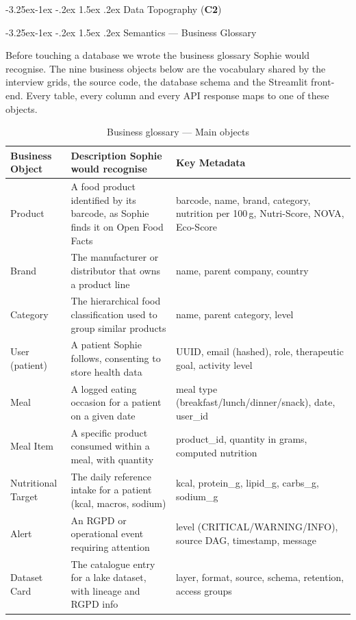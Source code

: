 \documentclass[a4paper,11pt,oneside,openany]{report}
\makeatletter
\renewcommand\subsection{\@startsection{subsection}{2}{\z@}%
  {-3.25ex\@plus -1ex \@minus -.2ex}%
  {1.5ex \@plus .2ex}%
  {\normalfont\large\bfseries\color{ntdarkgreen}}}
\renewcommand\subsubsection{\@startsection{subsubsection}{3}{\z@}%
  {-3.25ex\@plus -1ex \@minus -.2ex}%
  {1.5ex \@plus .2ex}%
  {\normalfont\normalsize\bfseries\color{ntblue}}}
\newcommand{\competence}[1]{\textbf{\textcolor{ntgreen}{#1}}}
\newcommand{\off}{Open Food Facts}
\newcommand{\rgpd}{RGPD}
\makeatother
\begin{document}
\subsection{Data Topography (\competence{C2})}

\subsubsection{Semantics --- Business Glossary}

Before touching a database we wrote the business glossary Sophie
would recognise. The nine business objects below are the
vocabulary shared by the interview grids, the source code, the
database schema and the Streamlit front-end. Every table, every
column and every API response maps to one of these objects.

\begin{table}[H]
\centering
\caption{Business glossary --- Main objects}
\label{tab:glossary}
\begin{tabularx}{\textwidth}{L{2.5cm} L{5cm} L{5.5cm}}
\toprule
\textbf{Business Object} & \textbf{Description Sophie would recognise} & \textbf{Key Metadata} \\
\midrule
Product & A food product identified by its barcode, as Sophie finds it on \off{} & barcode, name, brand, category, nutrition per 100\,g, Nutri-Score, NOVA, Eco-Score \\
Brand & The manufacturer or distributor that owns a product line & name, parent company, country \\
Category & The hierarchical food classification used to group similar products & name, parent category, level \\
User (patient) & A patient Sophie follows, consenting to store health data & UUID, email (hashed), role, therapeutic goal, activity level \\
Meal & A logged eating occasion for a patient on a given date & meal type (breakfast/lunch/dinner/snack), date, user\_id \\
Meal Item & A specific product consumed within a meal, with quantity & product\_id, quantity in grams, computed nutrition \\
Nutritional Target & The daily reference intake for a patient (kcal, macros, sodium) & kcal, protein\_g, lipid\_g, carbs\_g, sodium\_g \\
Alert & An \rgpd{} or operational event requiring attention & level (CRITICAL/WARNING/INFO), source DAG, timestamp, message \\
Dataset Card & The catalogue entry for a lake dataset, with lineage and RGPD info & layer, format, source, schema, retention, access groups \\
\bottomrule
\end{tabularx}
\end{table}
\end{document}
